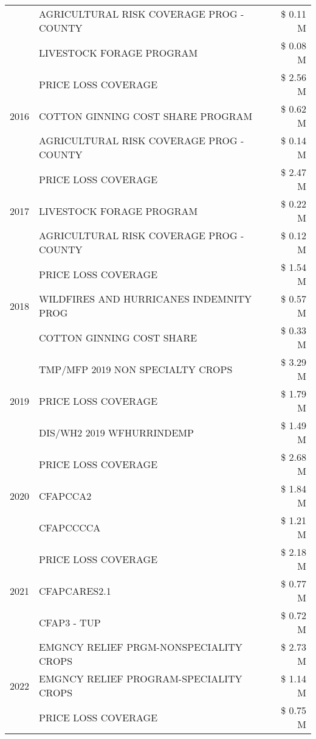 \begin{tabular}{llr}
 & AGRICULTURAL RISK COVERAGE PROG - COUNTY & \$ 0.11 M \\
 & LIVESTOCK FORAGE PROGRAM & \$ 0.08 M \\
\cline{1-3}
\multirow[t]{3}{*}{2016} & PRICE LOSS COVERAGE & \$ 2.56 M \\
 & COTTON GINNING COST SHARE PROGRAM & \$ 0.62 M \\
 & AGRICULTURAL RISK COVERAGE PROG - COUNTY & \$ 0.14 M \\
\cline{1-3}
\multirow[t]{3}{*}{2017} & PRICE LOSS COVERAGE & \$ 2.47 M \\
 & LIVESTOCK FORAGE PROGRAM & \$ 0.22 M \\
 & AGRICULTURAL RISK COVERAGE PROG - COUNTY & \$ 0.12 M \\
\cline{1-3}
\multirow[t]{3}{*}{2018} & PRICE LOSS COVERAGE & \$ 1.54 M \\
 & WILDFIRES AND HURRICANES INDEMNITY PROG & \$ 0.57 M \\
 & COTTON GINNING COST SHARE & \$ 0.33 M \\
\cline{1-3}
\multirow[t]{3}{*}{2019} & TMP/MFP 2019 NON SPECIALTY CROPS & \$ 3.29 M \\
 & PRICE LOSS COVERAGE & \$ 1.79 M \\
 & DIS/WH2 2019 WFHURRINDEMP & \$ 1.49 M \\
\cline{1-3}
\multirow[t]{3}{*}{2020} & PRICE LOSS COVERAGE & \$ 2.68 M \\
 & CFAPCCA2 & \$ 1.84 M \\
 & CFAPCCCCA & \$ 1.21 M \\
\cline{1-3}
\multirow[t]{3}{*}{2021} & PRICE LOSS COVERAGE & \$ 2.18 M \\
 & CFAPCARES2.1 & \$ 0.77 M \\
 & CFAP3 - TUP & \$ 0.72 M \\
\cline{1-3}
\multirow[t]{3}{*}{2022} & EMGNCY RELIEF PRGM-NONSPECIALITY CROPS & \$ 2.73 M \\
 & EMGNCY RELIEF PROGRAM-SPECIALITY CROPS & \$ 1.14 M \\
 & PRICE LOSS COVERAGE & \$ 0.75 M \\
\cline{1-3}
\bottomrule
\end{tabular}
